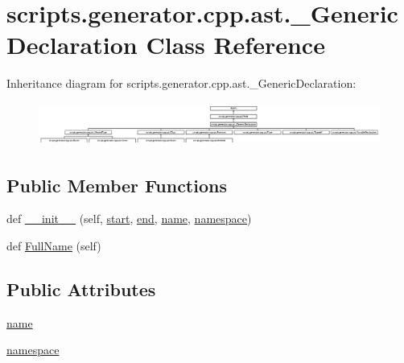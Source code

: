 \hypertarget{classscripts_1_1generator_1_1cpp_1_1ast_1_1___generic_declaration}{}\section{scripts.\+generator.\+cpp.\+ast.\+\_\+\+Generic\+Declaration Class Reference}
\label{classscripts_1_1generator_1_1cpp_1_1ast_1_1___generic_declaration}
Inheritance diagram for scripts.\+generator.\+cpp.\+ast.\+\_\+\+Generic\+Declaration\+:\begin{figure}[H]
\begin{center}
\leavevmode
\includegraphics[height=1.418440cm]{d5/dc7/classscripts_1_1generator_1_1cpp_1_1ast_1_1___generic_declaration}
\end{center}
\end{figure}
\subsection*{Public Member Functions}
\begin{DoxyCompactItemize}
\item 
def \mbox{\hyperlink{classscripts_1_1generator_1_1cpp_1_1ast_1_1___generic_declaration_ad30d7eeacaa81e4fe3d3f68461ca0cb4}{\+\_\+\+\_\+init\+\_\+\+\_\+}} (self, \mbox{\hyperlink{classscripts_1_1generator_1_1cpp_1_1ast_1_1_node_a27ce0a583baee598b75ac6dd21f8575b}{start}}, \mbox{\hyperlink{classscripts_1_1generator_1_1cpp_1_1ast_1_1_node_a8e3394f9dd405352610ff9be4f284e2c}{end}}, \mbox{\hyperlink{classscripts_1_1generator_1_1cpp_1_1ast_1_1___generic_declaration_a7cc4e9a1dace9c627d7fe4ce614a8888}{name}}, \mbox{\hyperlink{classscripts_1_1generator_1_1cpp_1_1ast_1_1___generic_declaration_a6e7fb8f951551af19f2366876a150817}{namespace}})
\item 
def \mbox{\hyperlink{classscripts_1_1generator_1_1cpp_1_1ast_1_1___generic_declaration_a6bbe2fb32aae10e04fdff739cc93376c}{Full\+Name}} (self)
\end{DoxyCompactItemize}
\subsection*{Public Attributes}
\begin{DoxyCompactItemize}
\item 
\mbox{\hyperlink{classscripts_1_1generator_1_1cpp_1_1ast_1_1___generic_declaration_a7cc4e9a1dace9c627d7fe4ce614a8888}{name}}
\item 
\mbox{\hyperlink{classscripts_1_1generator_1_1cpp_1_1ast_1_1___generic_declaration_a6e7fb8f951551af19f2366876a150817}{namespace}}
\end{DoxyCompactItemize}
